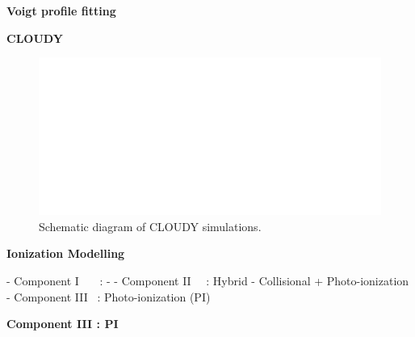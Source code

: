 \documentclass[aspectratio=169]{beamer}
\begin{document}
\begin{markdown}
\begin{frame}{\huge{{\textbf{Voigt profile fitting}}}}
\end{frame}




\begin{frame}[noframenumbering]{\textbf{CLOUDY}}
    
\begin{figure}[!htbp]
          \centering
          \includegraphics[width=12cm]{Figures/Mid-term/cloudy-transparent.png}
          \vspace*{-1mm}
          \caption{Schematic diagram of CLOUDY simulations.}
\end{figure}
        
\end{frame}



\begin{frame}{\huge{{\textbf{Ionization Modelling}}}}

- Component I \ \ \ : -
- Component II \ \  : Hybrid - Collisional + Photo-ionization
- Component III   \ : Photo-ionization (PI)

\end{frame}

\begin{frame}{\textbf{Component III : PI}}


\end{frame}
\end{markdown}
\end{document}
